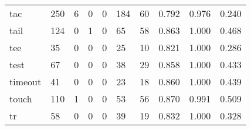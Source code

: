\begin{longtable}{lp{2.0cm}p{2.0cm}p{2.0cm}p{2.0cm}p{2.0cm}p{2.0cm}p{2.0cm}p{2.0cm}p{2.0cm}}
tac       &                    250 &                                             6 &                                            0 &                                           0 &                                          184 &                                         60 &                                0.792 &                                  0.976 &                                0.240 \\
tail      &                    124 &                                             0 &                                            1 &                                           0 &                                           65 &                                         58 &                                0.863 &                                  1.000 &                                0.468 \\
tee       &                     35 &                                             0 &                                            0 &                                           0 &                                           25 &                                         10 &                                0.821 &                                  1.000 &                                0.286 \\
test      &                     67 &                                             0 &                                            0 &                                           0 &                                           38 &                                         29 &                                0.858 &                                  1.000 &                                0.433 \\
timeout   &                     41 &                                             0 &                                            0 &                                           0 &                                           23 &                                         18 &                                0.860 &                                  1.000 &                                0.439 \\
touch     &                    110 &                                             1 &                                            0 &                                           0 &                                           53 &                                         56 &                                0.870 &                                  0.991 &                                0.509 \\
tr        &                     58 &                                             0 &                                            0 &                                           0 &                                           39 &                                         19 &                                0.832 &                                  1.000 &                                0.328 \\

\end{longtable}
